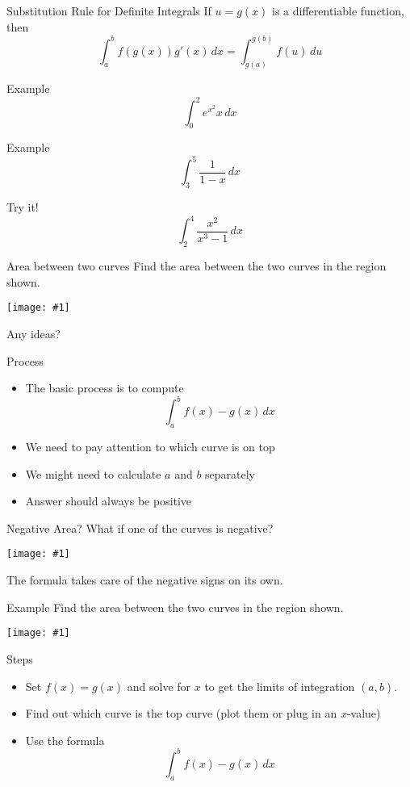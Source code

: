 \documentclass[t]{beamer}
\newcommand{\img}[1]{
\vfill
\begin{center}
\texttt{[image: \#1]}
\end{center}
\vfill
}
\begin{document}
\begin{frame}{Substitution Rule for Definite Integrals}
If $u = g(x)$ is a differentiable function, then
$$ \int_a^b f(g(x)) g'(x) \, dx = \int_{g(a)}^{g(b)} f(u) \, du $$
\end{frame}

\begin{frame}{Example}
$$ \int_0^2 e^{x^2} x \, dx $$
\end{frame}

\begin{frame}{Example}
$$ \int_3^5 \frac{1}{ 1 - x} \, dx $$
\end{frame}

\begin{frame}{Try it!}
$$ \int_2^4 \frac{x^2}{x^3 - 1} \, dx $$
\end{frame}

\begin{frame}{Area between two curves}
Find the area between the two curves in the region shown.
\img{twocurves}
Any ideas?
\end{frame}

\begin{frame}{Process}
\begin{itemize}
\item The basic process is to compute 
$$ \int_a^b f(x) - g(x) \, dx $$
\item We need to pay attention to which curve is on top
\item We might need to calculate $a$ and $b$ separately
\item Answer should always be positive
\end{itemize}
\end{frame}

\begin{frame}{Negative Area?}
What if one of the curves is negative?
\img{twomore}
The formula takes care of the negative signs on its own.
\end{frame}

\begin{frame}{Example}
Find the area between the two curves in the region shown.
\img{curves3}
\end{frame}

\begin{frame}{Steps}
\begin{itemize}
\item Set $f(x) = g(x)$ and solve for $x$ to get the limits of integration $(a,b)$.
\item Find out which curve is the top curve (plot them or plug in an $x$-value)
\item Use the formula
$$\int_a^b f(x) - g(x) \, dx $$
\end{itemize}
\end{frame}
\end{document}
